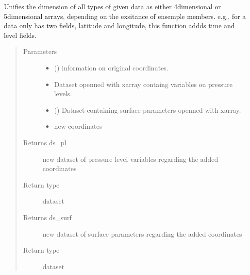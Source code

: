 \documentclass[a4paper,11pt,english]{sphinxmanual}
\begin{document}
\begin{fulllineitems}
\label{\detokenize{envlib:envlib.extend_dim.extend_dimensions}}
Unifies the dimension of all types of given data as either 4\sphinxhyphen{}dimensional or 5\sphinxhyphen{}dimensional arrays, depending on
the exsitance of ensemple members. e.g., for a data only has two fields, latitude and longitude, this function
addds time and level fields.
\begin{quote}\begin{description}
\item[{Parameters}] \leavevmode\begin{itemize}
\item {} 
 () \textendash{} information on original coordinates.

\item {} 
 \textendash{} Dataset openned with xarray containg variables on pressure levels.

\item {} 
 () \textendash{} Dataset containing surface parameters openned with xarray.

\item {} 
 \textendash{} new coordinates

\end{itemize}

\item[{Returns ds\_pl}] \leavevmode
new dataset of pressure level variables regarding the added coordinates

\item[{Return type}] \leavevmode
dataset

\item[{Returns ds\_surf}] \leavevmode
new dataset of surface parameters regarding the added coordinates

\item[{Return type}] \leavevmode
dataset

\end{description}\end{quote}

\end{fulllineitems}
\end{document}
